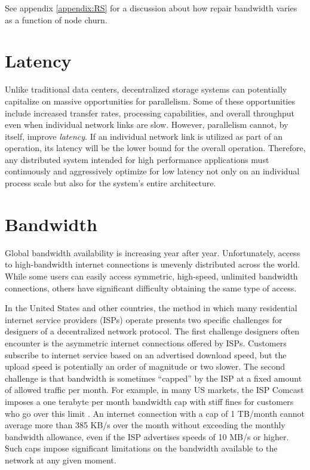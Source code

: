 \documentclass[11pt,fleqn,openany]{book}
\begin{document}
See appendix \ref{appendix:RS} for a discussion about how repair bandwidth
varies as a function of node churn.

\section{Latency}

Unlike traditional data centers,
decentralized storage systems can potentially capitalize on
massive opportunities for parallelism.
Some of these opportunities include increased transfer rates, processing
capabilities, and overall throughput even when individual
network links are slow. However, parallelism cannot, by itself, improve {\em
latency}. If an individual network link is utilized as part of an operation,
its latency will be the lower bound for the overall operation.
Therefore, any distributed system
intended for high performance applications must continuously and aggressively
optimize for low latency not only on an individual process scale but also for
the system's entire architecture.

\section{Bandwidth}\label{sec:req-bandwidth}

Global bandwidth availability is increasing year after year. Unfortunately,
access to
high-bandwidth internet connections is unevenly distributed across the world.
While some users can easily access symmetric, high-speed, unlimited bandwidth
connections, others have significant difficulty obtaining the same type of access.

In the United States and other countries,
the method in which many residential internet service providers (ISPs)
operate presents two specific challenges for designers of a
decentralized network protocol. The first challenge designers often encounter is
the asymmetric internet connections offered by ISPs.
Customers subscribe to internet service
based on an advertised download speed, but the upload speed is potentially an
order of magnitude or two slower. The second challenge is that bandwidth is
sometimes ``capped'' by the ISP at a fixed amount of allowed traffic per month.
For example, in many
US markets, the ISP Comcast imposes a one terabyte per month bandwidth cap
with stiff fines for customers who go over this limit \cite{comcast-cap}.
An internet connection with a cap of 1 TB/month cannot average more than
385 KB/s over the month without exceeding the monthly bandwidth allowance,
even if the ISP advertises speeds of 10 MB/s or higher.
Such caps impose
significant limitations on the bandwidth available to the network
at any given moment.
\end{document}

